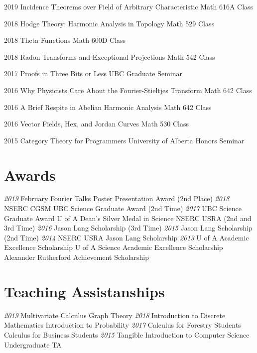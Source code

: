 \documentclass[a4paper]{cv-friggeri}
\begin{document}
\begin{entrylist}

\entry
{2019}
{Incidence Theorems over Field of Arbitrary Characteristic}
{Math 616A Class}
{}

\entry
{2018}
{Hodge Theory: Harmonic Analysis in Topology}
{Math 529 Class}
{}

\entry
{2018}
{Theta Functions}
{Math 600D Class}
{}

\entry
{2018}
{Radon Transforms and Exceptional Projections}
{Math 542 Class}
{}

\entry
{2017}
{Proofs in Three Bits or Less}
{UBC Graduate Seminar}
{}

\entry
{2016}
{Why Physicists Care About the Fourier-Stieltjes Transform}
{Math 642 Class}
{}

\entry
{2016}
{A Brief Respite in Abelian Harmonic Analysis}
{Math 642 Class}
{}

\entry
{2016}
{Vector Fields, Hex, and Jordan Curves}
{Math 530 Class}
{}

\entry
{2015}
{Category Theory for Programmers}
{University of Alberta Honors Seminar}
{}

\end{entrylist}

\begin{asidenotit}
\section{Awards}
\emph{2019}
February Fourier Talks Poster Presentation Award (2nd Place)
\emph{2018}
NSERC CGSM
UBC Science Graduate Award
(2nd Time)
\emph{2017}
UBC Science Graduate Award
U of A Dean's Silver Medal in Science
NSERC USRA
(2nd and 3rd Time)
\emph{2016}
Jason Lang Scholarship
(3rd Time)
\emph{2015}
Jason Lang Scholarship
(2nd Time)
\emph{2014}
NSERC USRA
Jason Lang Scholarship
\emph{2013}
U of A Academic Excellence Scholarship
U of A Science Academic Excellence Scholarship
Alexander Rutherford Achievement Scholarship
~
\section{Teaching Assistanships}
\emph{2019}
Multivariate Calculus
Graph Theory
\emph{2018}
Introduction to Discrete Mathematics
Introduction to Probability
\emph{2017}
Calculus for Forestry Students
Calculus for Business Students
\emph{2015}
Tangible Introduction to Computer Science Undergraduate TA
\end{asidenotit}
\end{document}
